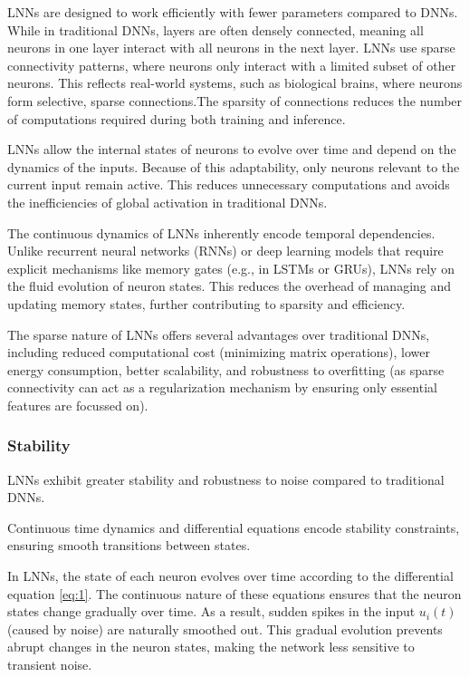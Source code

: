 LNNs are designed to work efficiently with fewer parameters compared to DNNs. While in traditional DNNs, layers are often densely connected, meaning all neurons in one layer interact with all neurons in the next layer. LNNs use sparse connectivity patterns, where neurons only interact with a limited subset of other neurons. This reflects real-world systems, such as biological brains, where neurons form selective, sparse connections.The sparsity of connections reduces the number of computations required during both training and inference.

LNNs allow the internal states of neurons to evolve over time and depend on the dynamics of the inputs. Because of this adaptability, only neurons relevant to the current input remain active. This reduces unnecessary computations and avoids the inefficiencies of global activation in traditional DNNs.

The continuous dynamics of LNNs inherently encode temporal dependencies. Unlike recurrent neural networks (RNNs) or deep learning models that require explicit mechanisms like memory gates (e.g., in LSTMs or GRUs), LNNs rely on the fluid evolution of neuron states. This reduces the overhead of managing and updating memory states, further contributing to sparsity and efficiency.

The sparse nature of LNNs offers several advantages over traditional DNNs, including reduced computational cost (minimizing matrix operations), lower energy consumption, better scalability, and robustness to overfitting (as sparse connectivity can act as a regularization mechanism by ensuring only essential features are focussed on).

\subsubsection{Stability}
LNNs exhibit greater stability and robustness to noise compared to traditional DNNs. 

Continuous time dynamics and differential equations encode stability constraints, ensuring smooth transitions between states.

In LNNs, the state of each neuron evolves over time according to the differential equation \ref{eq:1}. The continuous nature of these equations ensures that the neuron states change gradually over time. As a result, sudden spikes in the input \(u_i(t)\) (caused by noise) are naturally smoothed out. This gradual evolution prevents abrupt changes in the neuron states, making the network less sensitive to transient noise.

